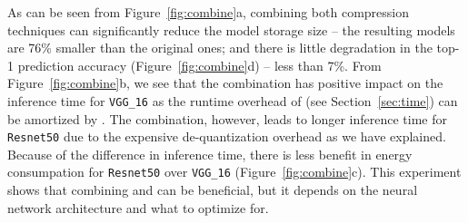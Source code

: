 As can be seen from Figure~\ref{fig:combine}a, combining both compression techniques can significantly reduce the model storage size -- the
resulting models are 76\% smaller than the original ones; and there is little degradation in the top-1 prediction accuracy
(Figure~\ref{fig:combine}d) -- less than 7\%. From Figure~\ref{fig:combine}b, we see that the combination has positive impact on the
inference time for \texttt{VGG\_16} as the runtime overhead of \dquantization (see Section~\ref{sec:time}) can be amortized by \pruning.
The combination, however, leads to longer inference time for \texttt{Resnet50} due to the expensive de-quantization overhead as we have
explained. Because of the difference in inference time, there is less benefit in energy consumpation for \texttt{Resnet50} over
\texttt{VGG\_16} (Figure~\ref{fig:combine}c). This experiment shows that combining \pruning and \quantization can be beneficial, but it
depends on the neural network architecture and what to optimize for.
